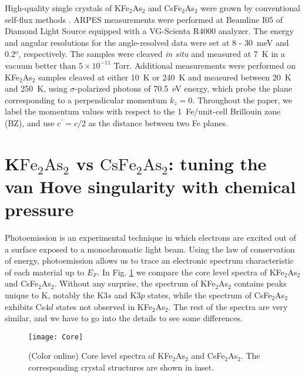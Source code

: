 \documentclass[twocolumn,aps,showpacs,preprintnumbers,amsmath,amssymb, superscriptaddress,longbibliography]{revtex4-1}
\begin{document}
High-quality single crystals of KFe$_2$As$_2$ and CsFe$_2$As$_2$ were grown by conventional self-flux methods \cite{AF_WangPRB89}. ARPES measurements were performed at Beamline I05 of Diamond Light Source equipped with a VG-Scienta R4000 analyzer. The energy and angular resolutions for the angle-resolved data were set at 8 - 30~meV and 0.2$^{\textrm{o}}$, respectively. The samples were cleaved \emph{in situ} and measured at 7~K in a vacuum better than $5\times 10^{-11}$ Torr. Additional measurements were performed on KFe$_2$As$_2$ samples cleaved at either 10~K or 240~K and measured between 20~K and 250~K, using $\sigma$-polarized photons of 70.5~eV energy, which probe the plane corresponding to a perpendicular momentum $k_z=0$. Throughout the paper, we label the momentum values with respect to the 1~Fe/unit-cell Brillouin zone (BZ), and use $c^{\prime} = c/2$ as the distance between two Fe planes.

\section{K$\textrm{Fe}_2$$\textrm{As}_2$ vs $\textrm{CsFe}_2$$\textrm{As}_2$: tuning the van Hove singularity with chemical pressure\label{Cs_section}}

Photoemission is an experimental technique in which electrons are excited out of a surface exposed to a monochromatic light beam. Using the law of conservation of energy, photoemission allows us to trace an electronic spectrum characteristic of each material up to $E_F$. In Fig. \ref{Core} we compare the core level spectra of KFe$_2$As$_2$ and CsFe$_2$As$_2$. Without any surprise, the spectrum of KFe$_2$As$_2$ contains peaks unique to K, notably the K$3s$ and K$3p$ states, while the spectrum of CsFe$_2$As$_2$ exhibits Cs$4d$ states not observed in KFe$_2$As$_2$. The rest of the spectra are very similar, and we have to go into the details to see some differences. 


\begin{figure}[!t]
\begin{center}
\texttt{[image: Core]}
\end{center}
\caption{\label{Core}(Color online) Core level spectra of KFe$_2$As$_2$ and CsFe$_2$As$_2$. The corresponding crystal structures are shown in inset.}
\end{figure}
\end{document}
